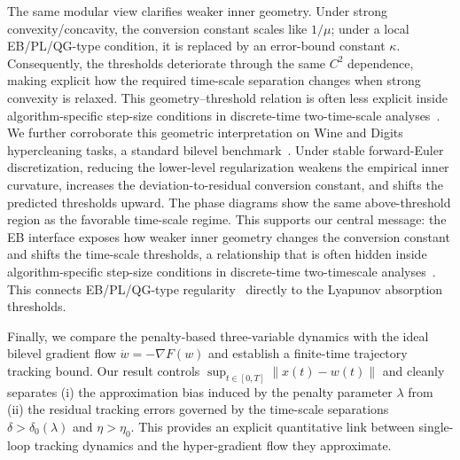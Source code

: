 \documentclass{article}
\newcommand{\1}{\mathbf{1}}
\begin{document}
The same modular view clarifies weaker inner geometry. Under strong
convexity/concavity, the conversion constant scales like $1/\mu$; under a local
EB/PL/QG-type condition, it is replaced by an error-bound constant $\kappa$.
Consequently, the thresholds deteriorate through the same $C^2$ dependence,
making explicit how the required time-scale separation changes when strong
convexity is relaxed. This geometry--threshold relation is often less explicit
inside algorithm-specific step-size conditions in discrete-time two-time-scale
analyses~\cite{chen2022single,hong2023two}. We further corroborate this geometric interpretation on Wine and Digits
hypercleaning tasks, a standard bilevel benchmark~\cite{franceschi2018bilevel,shaban2019truncated}.
Under stable forward-Euler discretization, reducing the lower-level
regularization weakens the empirical inner curvature, increases the
deviation-to-residual conversion constant, and shifts the predicted thresholds upward. The phase diagrams show the same above-threshold region as the favorable time-scale regime. This supports our central message: the EB interface exposes how weaker inner geometry changes the conversion constant and shifts the time-scale thresholds, a relationship that is often hidden inside
algorithm-specific step-size conditions in discrete-time two-timescale analyses~\cite{hong2023two}. This connects EB/PL/QG-type
regularity~\cite{liao2024error} directly to the Lyapunov absorption thresholds.

Finally, we compare the penalty-based three-variable dynamics with the ideal bilevel gradient flow
$\dot w=-\nabla F(w)$ and establish a finite-time trajectory tracking bound.
Our result controls $\sup_{t\in[0,T]}\|x(t)-w(t)\|$ and cleanly separates (i) the approximation bias induced by the penalty parameter $\lambda$
from (ii) the residual tracking errors governed by the time-scale separations $\delta>\delta_0(\lambda)$ and $\eta>\eta_0$.
This provides an explicit quantitative link between single-loop tracking dynamics and the hyper-gradient flow they approximate. 
\end{document}
